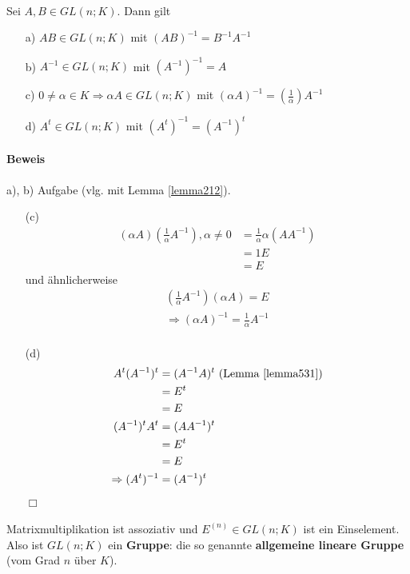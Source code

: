 \documentclass[11pt]{report}
\newcommand*\f[1] {\textbf{#1}}
\begin{document}
\begin{lemma} {\ \\}
\label{lemma533}
Sei $A, B \in GL(n;K)$. Dann gilt
\begin{itemize}
 \item[a)] $AB \in GL(n;K)$ mit $(AB)^{-1} = B^{-1}A^{-1}$
 \item[b)] $A^{-1} \in GL(n;K)$ mit $(A^{-1})^{-1} = A$
 \item[c)] $0 \neq \alpha \in K \Rightarrow \alpha A \in GL(n;K)$ mit $(\alpha A)^{-1} = (\frac{1}{\alpha}) A^{-1}$
 \item[d)] $A^t \in GL(n;K)$ mit $(A^t)^{-1} = (A^{-1})^t$
\end{itemize}
\end{lemma}

\paragraph{Beweis}
a), b) Aufgabe (vlg. mit Lemma \ref{lemma212}).\\
\begin{itemize}
 \item[(c)] 
\begin{align}
(\alpha A) (\frac{1}{\alpha} A^{-1}), \alpha \neq 0  &= \frac{1}{\alpha} \alpha (A A^{-1}) \\
 &= 1 E \\
 &= E
\end{align}
und ähnlicherweise
\begin{align}
 (\frac{1}{\alpha} A^{-1}) (\alpha A) = E \\
\Rightarrow (\alpha A)^{-1} = \frac{1}{\alpha} A^{-1} \\
\end{align}

 \item[(d)] 
\begin{align}
 A^t (A^{-1})^t &= (A^{-1} A)^t \text{ (Lemma \ref{lemma531})} \\
&= E^t \\
&= E \\
(A^{-1})^t A^t &= (A A^{-1})^t \\
 &= E^t \\
 &= E \\
\Rightarrow (A^t)^{-1} &= (A^{-1})^t
\end{align}
\hspace*{1cm} \hfill $\Box$
\end{itemize}
Matrixmultiplikation ist assoziativ und $E^{(n)} \in GL(n;K)$ ist ein Einselement. Also ist $GL(n;K)$ ein \f{Gruppe}: die so genannte \f{allgemeine lineare Gruppe} (vom Grad $n$ über $K$). \\
\end{document}
